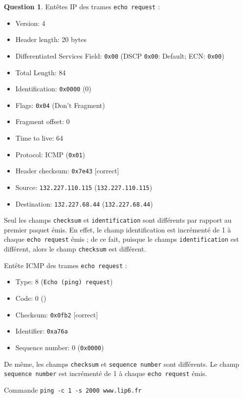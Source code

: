 \documentclass[11pt,english,french]{scrreprt}
\theoremstyle{remark}
\theoremstyle{definition}
\newtheorem{ques}{Question}[section]
\begin{document}
\begin{ques}
	Entêtes IP des trames \lstinline!echo request! :\begin{itemize}
		\item Version: 4
		\item Header length: 20 bytes
		\item Differentiated Services Field: \lstinline!0x00! (DSCP \lstinline!0x00!: Default; ECN: \lstinline!0x00!)
		\item Total Length: 84
		\item Identification: \lstinline!0x0000! (0)
		\item Flags: \lstinline!0x04! (Don't Fragment)
		\item Fragment offset: 0
		\item Time to live: 64
		\item Protocol: ICMP (\lstinline!0x01!)
		\item Header checksum: \lstinline!0x7e43! [correct]
		\item Source: \lstinline!132.227.110.115! (\lstinline!132.227.110.115!)
		\item Destination: \lstinline!132.227.68.44! (\lstinline!132.227.68.44!)
	\end{itemize}

	Seul les champs \lstinline!checksum! et \lstinline!identification! sont différents par rapport au premier paquet émis. En effet, le champ identification est incrémenté de 1 à chaque \lstinline!echo request! émis ; de ce fait, puisque le champs \lstinline!identification! est différent, alors le champ \lstinline!checksum! est différent.

	Entête ICMP des trames \lstinline!echo request! :\begin{itemize}
		\item Type: 8 (\lstinline!Echo (ping) request!)
		\item Code: 0 ()
		\item Checksum: \lstinline!0x0fb2! [correct]
		\item Identifier: \lstinline!0xa76a!
		\item Sequence number: 0 (\lstinline!0x0000!)
	\end{itemize}

	De même, les champs \lstinline!checksum! et \lstinline!sequence number! sont différents.
	Le champ \lstinline!sequence number! est incrémenté de 1 à chaque \lstinline!echo request! émis.
\end{ques}

Commande \lstinline!ping -c 1 -s 2000 www.lip6.fr!
\end{document}
